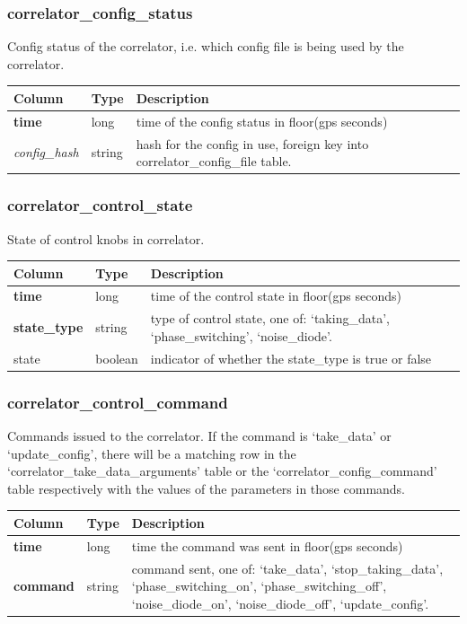 \documentclass{article}
\begin{document}
\subsubsection{correlator\_config\_status}
Config status of the correlator, i.e. which config file is being used by the correlator.
\begin{center}
 \begin{tabular}{| p{4cm} | p{2cm} | p{10cm} |}
\hline
 {\bf Column} & {\bf Type}  & {\bf Description} \\ [0.5ex]  \hline\hline
\textbf{time} & long & time of the config status in floor(gps seconds)\\ \hline
\textit{config\_hash} & string & hash for the config in use, foreign key into correlator\_config\_file table.\\ \hline
\end{tabular}
\end{center}


\subsubsection{correlator\_control\_state}
State of control knobs in correlator.
\begin{center}
 \begin{tabular}{| p{4cm} | p{2cm} | p{10cm} |}
\hline
 {\bf Column} & {\bf Type}  & {\bf Description} \\ [0.5ex]  \hline\hline
\textbf{time} & long & time of the control state in floor(gps seconds)\\ \hline
\textbf{state\_type} & string & type of control state, one of: `taking\_data', `phase\_switching',  `noise\_diode'.  \\ \hline
state & boolean & indicator of whether the state\_type is true or false \\\hline
\end{tabular}
\end{center}

\subsubsection{correlator\_control\_command}
Commands issued to the correlator. If the command is `take\_data' or `update\_config', there will be a matching row in the `correlator\_take\_data\_arguments' table or the `correlator\_config\_command' table respectively with the values of the parameters in those commands.
\begin{center}
 \begin{tabular}{| p{4cm} | p{2cm} | p{10cm} |}
\hline
 {\bf Column} & {\bf Type}  & {\bf Description} \\ [0.5ex]  \hline\hline
\textbf{time} & long & time the command was sent in floor(gps seconds)\\ \hline
\textbf{command} & string & command sent, one of: `take\_data', `stop\_taking\_data',  `phase\_switching\_on',  `phase\_switching\_off',  `noise\_diode\_on',  `noise\_diode\_off',  `update\_config'.  \\ \hline
\end{tabular}
\end{center}
\end{document}
